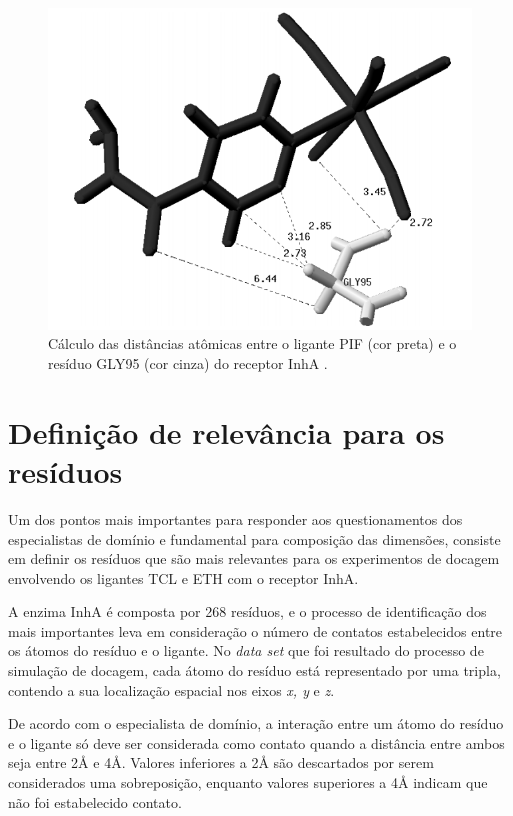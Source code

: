 \begin{figure}[h]
	\center
	\includegraphics[scale=0.55]{images/distEucli.png}
	\caption{Cálculo das distâncias atômicas entre o ligante PIF (cor preta) e o resíduo GLY95 (cor cinza) do receptor InhA \cite{KARANADUNOSM09}.}
	\label{fig:PIFvsGLY}
\end{figure} 

\section{Definição de relevância para os resíduos}

Um dos pontos mais importantes para responder aos questionamentos dos especialistas de domínio e fundamental para composição das dimensões, consiste em definir os resíduos que são mais relevantes para os experimentos de docagem envolvendo os ligantes TCL e ETH com o receptor InhA. 

A enzima InhA é composta por 268 resíduos, e o processo de identificação dos mais importantes leva em consideração o número de contatos estabelecidos entre os átomos do resíduo e o ligante. No \emph{data set} que foi resultado do processo de simulação de docagem, cada átomo do resíduo está representado por uma tripla, contendo a sua localização espacial nos eixos \emph{x, y }e \emph{z}.

De acordo com o especialista de domínio, a interação entre um átomo do resíduo e o ligante só deve ser considerada como contato quando a distância entre ambos seja entre 2{\AA} e 4{\AA}. Valores inferiores a 2{\AA} são descartados por serem considerados uma sobreposição, enquanto valores superiores a 4{\AA} indicam que não foi estabelecido contato. 

